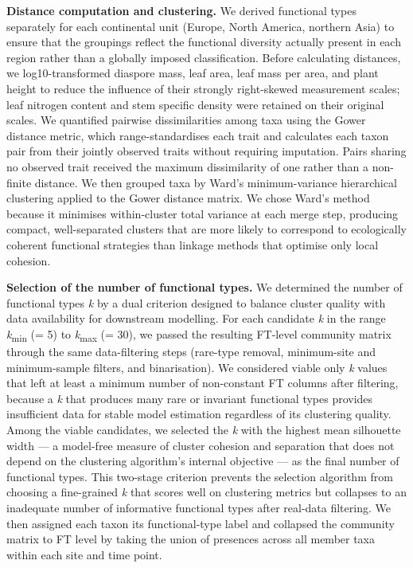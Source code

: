 \documentclass[
  12pt,
]{article}
\begin{document}
\textbf{Distance computation and clustering.} We derived functional
types separately for each continental unit (Europe, North America,
northern Asia) to ensure that the groupings reflect the functional
diversity actually present in each region rather than a globally imposed
classification. Before calculating distances, we log10-transformed
diaspore mass, leaf area, leaf mass per area, and plant height to reduce
the influence of their strongly right-skewed measurement scales; leaf
nitrogen content and stem specific density were retained on their
original scales. We quantified pairwise dissimilarities among taxa using
the Gower distance metric, which range-standardises each trait and
calculates each taxon pair from their jointly observed traits without
requiring imputation. Pairs sharing no observed trait received the
maximum dissimilarity of one rather than a non-finite distance. We then
grouped taxa by Ward's minimum-variance hierarchical clustering applied
to the Gower distance matrix. We chose Ward's method because it
minimises within-cluster total variance at each merge step, producing
compact, well-separated clusters that are more likely to correspond to
ecologically coherent functional strategies than linkage methods that
optimise only local cohesion.

\textbf{Selection of the number of functional types.} We determined the
number of functional types \emph{k} by a dual criterion designed to
balance cluster quality with data availability for downstream modelling.
For each candidate \emph{k} in the range \emph{k}\textsubscript{min} (=
5) to \emph{k}\textsubscript{max} (= 30), we passed the resulting
FT-level community matrix through the same data-filtering steps
(rare-type removal, minimum-site and minimum-sample filters, and
binarisation). We considered viable only \emph{k} values that left at
least a minimum number of non-constant FT columns after filtering,
because a \emph{k} that produces many rare or invariant functional types
provides insufficient data for stable model estimation regardless of its
clustering quality. Among the viable candidates, we selected the
\emph{k} with the highest mean silhouette width --- a model-free measure
of cluster cohesion and separation that does not depend on the
clustering algorithm's internal objective --- as the final number of
functional types. This two-stage criterion prevents the selection
algorithm from choosing a fine-grained \emph{k} that scores well on
clustering metrics but collapses to an inadequate number of informative
functional types after real-data filtering. We then assigned each taxon
its functional-type label and collapsed the community matrix to FT level
by taking the union of presences across all member taxa within each site
and time point.
\end{document}
